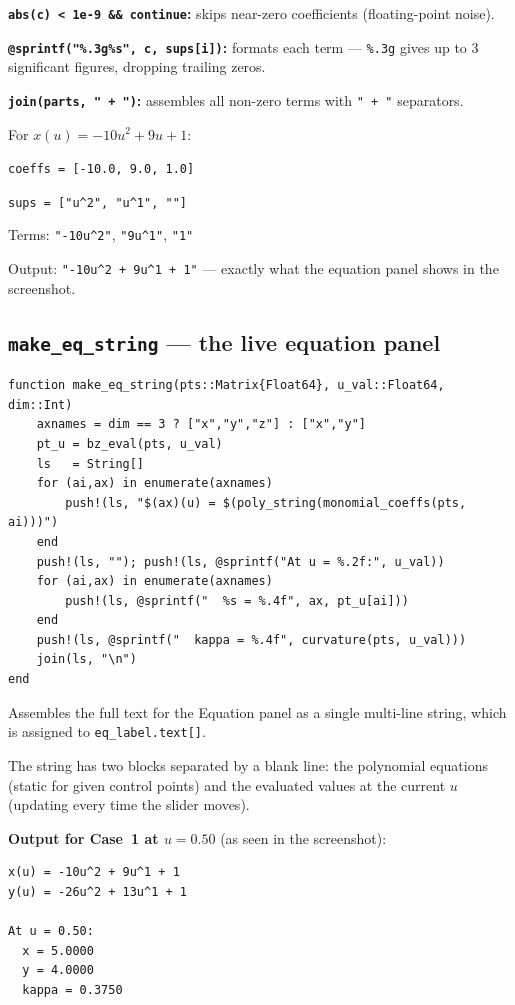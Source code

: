 \documentclass[12pt, a4paper]{article}
\newcommand{\cd}[1]{\texttt{#1}}
\begin{document}
\textbf{\cd{abs(c) < 1e-9 \&\& continue}:}
skips near-zero coefficients (floating-point noise).

\textbf{\cd{@sprintf("\%.3g\%s", c, sups[i])}:}
formats each term --- \cd{\%.3g} gives up to 3 significant
figures, dropping trailing zeros.

\textbf{\cd{join(parts, " + ")}:}
assembles all non-zero terms with \cd{" + "} separators.

\begin{examplebox}
For $x(u) = -10u^2 + 9u + 1$:

\cd{coeffs = [-10.0, 9.0, 1.0]}

\cd{sups = ["u\^{}2", "u\^{}1", ""]}

Terms: \cd{"-10u\^{}2"}, \cd{"9u\^{}1"}, \cd{"1"}

Output: \cd{"-10u\^{}2 + 9u\^{}1 + 1"} --- exactly what
the equation panel shows in the screenshot.
\end{examplebox}

\subsection{\texttt{make\_eq\_string} --- the live equation panel}

\begin{verbatim}
function make_eq_string(pts::Matrix{Float64}, u_val::Float64, dim::Int)
    axnames = dim == 3 ? ["x","y","z"] : ["x","y"]
    pt_u = bz_eval(pts, u_val)
    ls   = String[]
    for (ai,ax) in enumerate(axnames)
        push!(ls, "$(ax)(u) = $(poly_string(monomial_coeffs(pts, ai)))")
    end
    push!(ls, ""); push!(ls, @sprintf("At u = %.2f:", u_val))
    for (ai,ax) in enumerate(axnames)
        push!(ls, @sprintf("  %s = %.4f", ax, pt_u[ai]))
    end
    push!(ls, @sprintf("  kappa = %.4f", curvature(pts, u_val)))
    join(ls, "\n")
end
\end{verbatim}

Assembles the full text for the Equation panel as a
single multi-line string, which is assigned to
\cd{eq\_label.text[]}.

The string has two blocks separated by a blank line:
the polynomial equations (static for given control points)
and the evaluated values at the current $u$ (updating
every time the slider moves).

\begin{examplebox}
\textbf{Output for Case~1 at $u=0.50$} (as seen in the screenshot):
\begin{verbatim}
x(u) = -10u^2 + 9u^1 + 1
y(u) = -26u^2 + 13u^1 + 1

At u = 0.50:
  x = 5.0000
  y = 4.0000
  kappa = 0.3750
\end{verbatim}
\end{examplebox}
\end{document}
